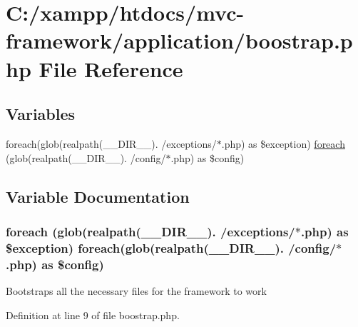 \hypertarget{boostrap_8php}{}\section{C\+:/xampp/htdocs/mvc-\/framework/application/boostrap.php File Reference}
\label{boostrap_8php}
\subsection*{Variables}
\begin{DoxyCompactItemize}
\item 
foreach(glob(realpath(\+\_\+\+\_\+\+D\+I\+R\+\_\+\+\_\+). \textquotesingle{}/exceptions/$\ast$.php\textquotesingle{}) as \$exception) \hyperlink{boostrap_8php_a082ff60a5613c40db3435a164f1d4aca}{foreach} (glob(realpath(\+\_\+\+\_\+\+D\+I\+R\+\_\+\+\_\+). \textquotesingle{}/config/$\ast$.php\textquotesingle{}) as \$config)
\end{DoxyCompactItemize}


\subsection{Variable Documentation}
\hypertarget{boostrap_8php_a082ff60a5613c40db3435a164f1d4aca}{}
\subsubsection[{foreach}]{\setlength{\rightskip}{0pt plus 5cm}foreach (glob(realpath(\+\_\+\+\_\+\+D\+I\+R\+\_\+\+\_\+). \textquotesingle{}/exceptions/$\ast$.php\textquotesingle{}) as \$exception) foreach(glob(realpath(\+\_\+\+\_\+\+D\+I\+R\+\_\+\+\_\+). \textquotesingle{}/config/$\ast$.php\textquotesingle{}) as \$config)}\label{boostrap_8php_a082ff60a5613c40db3435a164f1d4aca}
Bootstraps all the necessary files for the framework to work 

Definition at line 9 of file boostrap.\+php.

